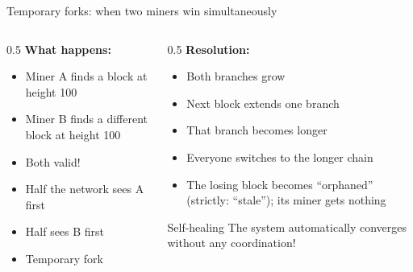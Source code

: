 \ifdefined\PRESENTATION\else\PassOptionsToClass{handout}{beamer}\fi\documentclass[aspectratio=169, lualatex]{beamer}
\begin{document}
\begin{frame}{Temporary forks: when two miners win simultaneously}
	\begin{columns}[c]
		\begin{column}{0.5\textwidth}
			\textbf{What happens:}
			\begin{itemize}
				\item Miner A finds a block at height 100
				\item Miner B finds a different block at height 100
				\item Both valid!
				\item Half the network sees A first
				\item Half sees B first
				\item Temporary fork
			\end{itemize}
		\end{column}
		\begin{column}{0.5\textwidth}
			\textbf{Resolution:}
			\begin{itemize}
				\item Both branches grow
				\item Next block extends one branch
				\item That branch becomes longer
				\item Everyone switches to the longer chain
				\item The losing block becomes ``orphaned'' (strictly: ``stale''); its miner gets nothing
			\end{itemize}
			\begin{alertblock}{Self-healing}
				The system automatically converges without any coordination!
			\end{alertblock}
		\end{column}
	\end{columns}
\end{frame}
\end{document}
